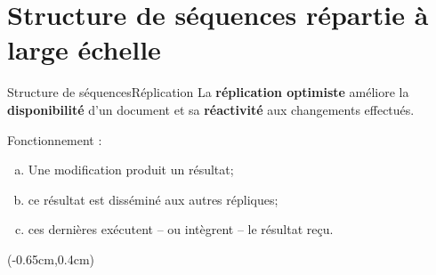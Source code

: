 \section{Structure de séquences répartie à large échelle}

\begin{frame}{Structure de séquences}{Réplication}
  \vspace{-1.5cm}
  La \textbf{réplication optimiste} \REF{} améliore la \textbf{disponibilité} d'un
  document et sa \textbf{réactivité} aux changements effectués.
  \vspace{0.75cm}

  Fonctionnement :
  \begin{enumerate}[(a)]
  \item Une modification produit un résultat;
  \item ce résultat est disséminé aux autres répliques;
  \item ces dernières exécutent -- ou intègrent -- le résultat reçu.
  \end{enumerate}

  \begin{textblock*}{\textwidth}(-0.65cm,0.4cm) 
    
  \end{textblock*}

\end{frame}

